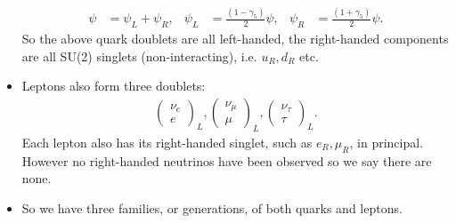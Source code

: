 \documentclass[a4paper, 11pt, normalem]{report}
\begin{document}
\begin{itemize}
\begin{align}
            \psi &= \psi_L + \psi_R, &
            \psi_L &= \frac{(1-\gamma_5)}{2}\psi, &
            \psi_R &= \frac{(1+\gamma_5)}{2}\psi.
        \end{align}
        So the above quark doublets are all left-handed, the right-handed components are all SU(2) singlets (non-interacting), i.e. $u_R,d_R$ etc.
    \item Leptons also form three doublets:
        \begin{align}
            \begin{pmatrix}\nu_e\\e\end{pmatrix}_L,
            \begin{pmatrix}\nu_\mu\\\mu\end{pmatrix}_L,
            \begin{pmatrix}\nu_\tau\\\tau\end{pmatrix}_L.
        \end{align}
        Each lepton also has its right-handed singlet, such as $e_R,\mu_R$, in principal.
        However no right-handed neutrinos have been observed so we say there are none.
    \item So we have three families, or generations, of both quarks and leptons.
\end{itemize}
\end{document}
